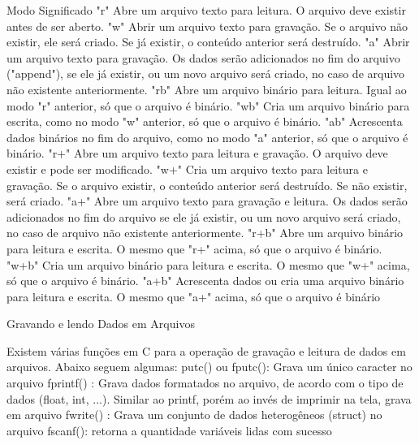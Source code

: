 Modo Significado
"r" Abre um arquivo texto para leitura. O arquivo deve existir antes de ser aberto.
"w" Abrir um arquivo texto para gravação. Se o arquivo não existir, ele será criado. Se já existir, o conteúdo anterior será destruído.
"a" Abrir um arquivo texto para gravação. Os dados serão adicionados no fim do arquivo ("append"), se ele já existir, ou um novo arquivo será
criado, no caso de arquivo não existente anteriormente.
"rb" Abre um arquivo binário para leitura. Igual ao modo "r" anterior, só que o arquivo é binário.
"wb" Cria um arquivo binário para escrita, como no modo "w" anterior, só que o arquivo é binário.
"ab" Acrescenta dados binários no fim do arquivo, como no modo "a" anterior, só que o arquivo é binário.
"r+" Abre um arquivo texto para leitura e gravação. O arquivo deve existir e pode ser modificado.
"w+" Cria um arquivo texto para leitura e gravação. Se o arquivo existir, o conteúdo anterior será destruído. Se não existir, será criado.
"a+" Abre um arquivo texto para gravação e leitura. Os dados serão adicionados no fim do arquivo se ele já existir, ou um novo arquivo será
criado, no caso de arquivo não existente anteriormente.
"r+b" Abre um arquivo binário para leitura e escrita. O mesmo que "r+" acima, só que o arquivo é binário.
"w+b" Cria um arquivo binário para leitura e escrita. O mesmo que "w+" acima, só que o arquivo é binário.
"a+b" Acrescenta dados ou cria uma arquivo binário para leitura e escrita. O mesmo que "a+" acima, só que o arquivo é binário


Gravando e lendo Dados em Arquivos

 Existem várias funções em C para a operação de
gravação e leitura de dados em arquivos. Abaixo
seguem algumas:
 putc() ou fputc(): Grava um único caracter no arquivo
 fprintf() : Grava dados formatados no arquivo, de acordo
com o tipo de dados (float, int, ...). Similar ao printf,
porém ao invés de imprimir na tela, grava em arquivo
 fwrite() : Grava um conjunto de dados heterogêneos
(struct) no arquivo
 fscanf(): retorna a quantidade variáveis lidas com
sucesso



